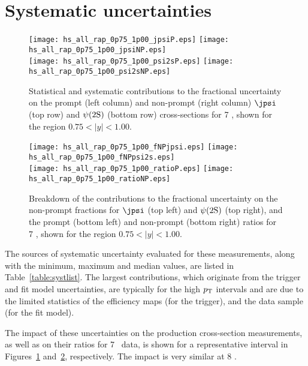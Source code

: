 \section{Systematic uncertainties}
\label{sec:syst}

\begin{figure} [!h]
  \begin{center}
    \texttt{[image: hs\_all\_rap\_0p75\_1p00\_jpsiP.eps]}
    \texttt{[image: hs\_all\_rap\_0p75\_1p00\_jpsiNP.eps]}\\
    \texttt{[image: hs\_all\_rap\_0p75\_1p00\_psi2sP.eps]}
    \texttt{[image: hs\_all\_rap\_0p75\_1p00\_psi2sNP.eps]}    
    \caption{Statistical and systematic contributions to the fractional uncertainty on the prompt (left column) and non-prompt (right column)
    $\jpsi$ (top row) and $\psi(2\mathrm{S})$ (bottom row) cross-sections for 7 \TeV, 
    shown for the region $0.75<|y|<1.00$.}
    \label{fig:fracsyst_xs}
  \end{center}
\end{figure}

\begin{figure} [!h]
  \begin{center}
    \texttt{[image: hs\_all\_rap\_0p75\_1p00\_fNPjpsi.eps]}
    \texttt{[image: hs\_all\_rap\_0p75\_1p00\_fNPpsi2s.eps]}\\
    \texttt{[image: hs\_all\_rap\_0p75\_1p00\_ratioP.eps]}
    \texttt{[image: hs\_all\_rap\_0p75\_1p00\_ratioNP.eps]} 
    \caption{Breakdown of the contributions to the fractional uncertainty on the non-prompt fractions for $\jpsi$ (top left) and $\psi(2\mathrm{S})$ (top right), 
    and the prompt (bottom left) and non-prompt (bottom right) ratios for 7 \TeV, 
    shown for the region $0.75<|y|<1.00$.}
    \label{fig:fracsyst_ratio}
  \end{center}
\end{figure}


The sources of systematic uncertainty evaluated for these measurements, along with the minimum, maximum and median values, are listed in Table~\ref{table:systlist}.
The largest contributions, which originate from the trigger and fit model uncertainties, are typically for the 
high $\mbox{$p_{\text{T}}$}$ intervals and are due to the limited statistics of the efficiency maps (for the trigger), and the data sample (for the fit model).

The impact of these uncertainties on the production cross-section measurements, 
as well as on their ratios for 7 \TeV\ data, is shown for a representative interval in
Figures~\ref{fig:fracsyst_xs} and~\ref{fig:fracsyst_ratio}, respectively.
The impact is very similar at 8 \TeV.


